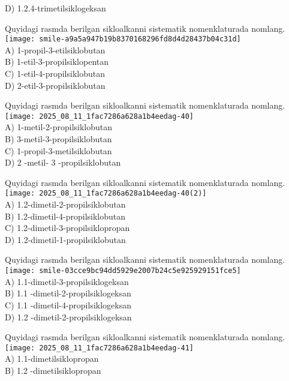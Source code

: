 D) 1.2.4-trimetilsiklogeksan
  \item Quyidagi rasmda berilgan sikloalkanni sistematik nomenklaturada nomlang.\\
\texttt{[image: smile-a9a5a947b19b8370168296fd8d4d28437b04c31d]}\\
A) 1-propil-3-etilsiklobutan\\
B) 1-etil-3-propilsiklopentan\\
C) 1-etil-4-propilsiklobutan\\
D) 2-etil-3-propilsiklobutan
  \item Quyidagi rasmda berilgan sikloalkanni sistematik nomenklaturada nomlang.\\
\texttt{[image: 2025\_08\_11\_1fac7286a628a1b4eedag-40]}\\
A) 1-metil-2-propilsiklobutan\\
B) 3-metil-3-propilsiklobutan\\
C) 1-propil-3-metilsiklobutan\\
D) 2 -metil- 3 -propilsiklobutan
  \item Quyidagi rasmda berilgan sikloalkanni sistematik nomenklaturada nomlang.\\
\texttt{[image: 2025\_08\_11\_1fac7286a628a1b4eedag-40(2)]}\\
A) 1.2-dimetil-2-propilsiklobutan\\
B) 1.2-dimetil-4-propilsiklobutan\\
C) 1.2-dimetil-3-propilsiklopropan\\
D) 1.2-dimetil-1-propilsiklobutan
  \item Quyidagi rasmda berilgan sikloalkanni sistematik nomenklaturada nomlang.\\
\texttt{[image: smile-03cce9bc94dd5929e2007b24c5e925929151fce5]}\\
A) 1.1-dimetil-3-propilsiklogeksan\\
B) 1.1 -dimetil-2-propilsiklogeksan\\
C) 1.1 -dimetil-4-propilsiklogeksan\\
D) 1.2 -dimetil-2-propilsiklogeksan
  \item Quyidagi rasmda berilgan sikloalkanni sistematik nomenklaturada nomlang.\\
\texttt{[image: 2025\_08\_11\_1fac7286a628a1b4eedag-41]}\\
A) 1.1-dimetilsiklopropan\\
B) 1.2 -dimetilsiklopropan\\
